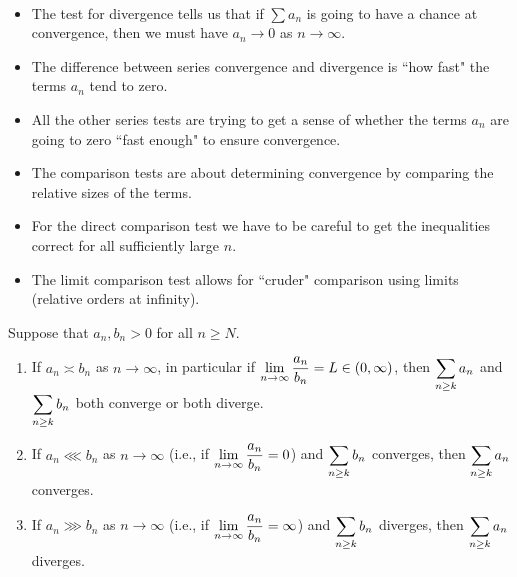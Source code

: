 \begin{remark}\,
\begin{itemize}
\item The test for divergence tells us that if $\sum a_n$ is going to have a chance at convergence, then we must have $a_n\to 0$ as $n\to\infty$.
\item The difference between series convergence and divergence is ``how fast" the terms $a_n$ tend to zero.
\item All the other series tests are trying to get a sense of whether the terms $a_n$ are going to zero ``fast enough" to ensure convergence.
\item The comparison tests are about determining convergence by comparing the relative sizes of the terms.
\item For the direct comparison test we have to be careful to get the inequalities correct for all sufficiently large $n$.
\item The limit comparison test allows for ``cruder" comparison using limits (relative orders at infinity).
\end{itemize}
\end{remark}

\begin{theorem}
Suppose that $a_n, b_n>0$ for all $n\ge N$.
\begin{enumerate}
\item If $a_n\asymp b_n$ as $n\to\infty$, in particular if $\displaystyle\lim_{n\to\infty}\frac{a_n}{b_n}=L\in (0,\infty)$, 
then $\displaystyle\sum_{n\ge k} a_n$ and $\displaystyle\sum_{n\ge k} b_n$ both converge or both diverge.
\item If $a_n\lll b_n$ as $n\to\infty$ (i.e., if $\displaystyle\lim_{n\to\infty}\frac{a_n}{b_n}=0$) and $\displaystyle\sum_{n\ge k} b_n$ converges, then $\displaystyle\sum_{n\ge k} a_n$ converges.
\item If $a_n\ggg b_n$ as $n\to\infty$ (i.e., if $\displaystyle\lim_{n\to\infty}\frac{a_n}{b_n}=\infty$) and $\displaystyle\sum_{n\ge k} b_n$ diverges, then $\displaystyle\sum_{n\ge k} a_n$ diverges.
\end{enumerate}
\end{theorem}

\newpage

